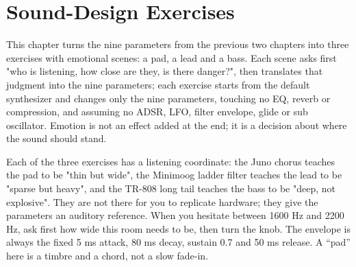 \chapter{Sound-Design Exercises}
\label{chap:sound-design-exercises}


This chapter turns the nine parameters from the previous two chapters into three exercises with emotional scenes: a pad, a lead and a bass. Each scene asks first "who is listening, how close are they, is there danger?", then translates that judgment into the nine parameters; each exercise starts from the default synthesizer and changes only the nine parameters, touching no EQ, reverb or compression, and assuming no ADSR, LFO, filter envelope, glide or sub oscillator. Emotion is not an effect added at the end; it is a decision about where the sound should stand.

Each of the three exercises has a listening coordinate: the Juno chorus teaches the pad to be "thin but wide", the Minimoog ladder filter teaches the lead to be "sparse but heavy", and the TR-808 long tail teaches the bass to be "deep, not explosive". They are not there for you to replicate hardware; they give the parameters an auditory reference. When you hesitate between 1600 Hz and 2200 Hz, ask first how wide this room needs to be, then turn the knob. The envelope is always the fixed 5 ms attack, 80 ms decay, sustain 0.7 and 50 ms release. A ``pad'' here is a timbre and a chord, not a slow fade-in.

\begin{center}
\end{center}

